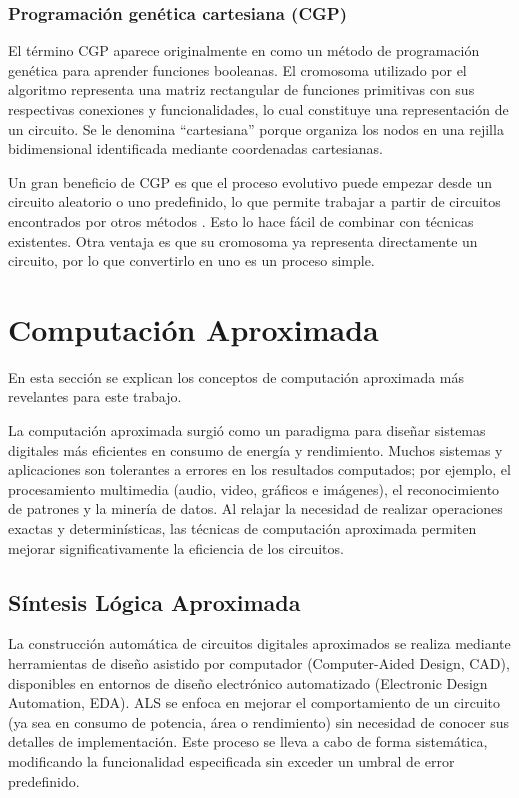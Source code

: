 \subsubsection{Programación genética cartesiana (CGP)}

El término CGP aparece originalmente en \cite{miller_empirical_1999} como un
método de programación genética para aprender funciones booleanas. El cromosoma
utilizado por el algoritmo representa una matriz rectangular de funciones
primitivas con sus respectivas conexiones y funcionalidades, lo cual constituye
una representación de un circuito. Se le denomina ``cartesiana'' porque
organiza los nodos en una rejilla bidimensional identificada mediante
coordenadas cartesianas.

Un gran beneficio de CGP es que el proceso evolutivo puede empezar desde un
circuito aleatorio o uno predefinido, lo que permite trabajar a partir de
circuitos encontrados por otros métodos \cite{berndt_cgp-based_2022}. Esto lo
hace fácil de combinar con técnicas existentes. Otra ventaja es que su
cromosoma ya representa directamente un circuito, por lo que convertirlo en uno
es un proceso simple.

\section{Computación Aproximada}

En esta sección se explican los conceptos de computación aproximada más
revelantes para este trabajo.

La computación aproximada surgió como un paradigma para diseñar sistemas
digitales más eficientes en consumo de energía y rendimiento. Muchos sistemas y
aplicaciones son tolerantes a errores en los resultados computados; por
ejemplo, el procesamiento multimedia (audio, video, gráficos e imágenes), el
reconocimiento de patrones y la minería de datos. Al relajar la necesidad de
realizar operaciones exactas y determinísticas, las técnicas de computación
aproximada permiten mejorar significativamente la eficiencia de los circuitos.
\cite{han_approximate_2013}

\subsection{Síntesis Lógica Aproximada}

La construcción automática de circuitos digitales aproximados se realiza
mediante herramientas de diseño asistido por computador (Computer-Aided Design,
CAD), disponibles en entornos de diseño electrónico automatizado (Electronic
Design Automation, EDA). ALS se enfoca en mejorar el comportamiento de un
circuito (ya sea en consumo de potencia, área o rendimiento) sin necesidad de
conocer sus detalles de implementación. Este proceso se lleva a cabo de forma
sistemática, modificando la funcionalidad especificada sin exceder un umbral de
error predefinido.
\cite{ammes_two-level_2022}

